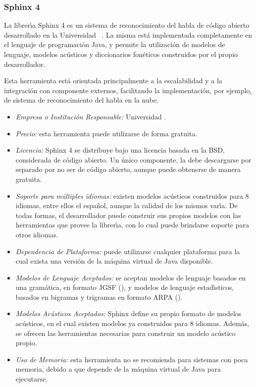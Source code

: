 \subsubsection{Sphinx 4}
\label{sec:sphinx}

La librer{\'\i}a Sphinx 4 es un sistema de reconocimiento del habla de c\'odigo abierto desarrollado en
la Universidad \mbox{ \cite{Sphinx4}}. La misma est\'a implementada
completamente en el lenguaje de programaci\'on Java, y permite la utilizaci\'on de modelos de lenguaje,
modelos ac\'usticos y diccionarios fon\'eticos construidos por el propio desarrollador.

Esta herramienta est\'a orientada principalmente a la escalabilidad y a la integraci\'on con
componente externos, facilitando la implementaci\'on, por ejemplo, de sistema de reconocimiento del
habla en la nube.

\begin{itemize}
	\item \emph{Empresa o Instituci\'on Responsable:} Universidad .
	\item \emph{Precio:} esta herramienta puede utilizarse de forma gratuita.
	\item \emph{Licencia:} Sphinx 4 se distribuye bajo una licencia basada en la BSD, considerada
	de c\'odigo abierto. Un \'unico componente, la  debe descargarse por
	separado por no ser de c\'odigo abierto, aunque puede obtenerse de manera gratuita.
	\item \emph{Soporte para m\'ultiples idiomas:} existen modelos ac\'usticos construidos para
	8 idiomas, entre ellos el espa\~nol, aunque la calidad de los mismos var{\'\i}a.
	De todas formas, el desarrollador puede construir sus propios modelos con las herramientas
	que provee la librer{\'\i}a, con lo cual puede brindarse soporte para otros idiomas.
	\item \emph{Dependencia de Plataforma:} puede utilizarse cualquier plataforma para la cual
	exista una versi\'on de la m\'aquina virtual de Java disponible.
	\item \emph{Modelos de Lenguaje Aceptados:} se aceptan modelos de lenguaje basados en una
        gram\'atica, en formato JGSF (), y modelos de 
        lenguaje estad{\'\i}sticos, basados en bigramas y trigramas en formato ARPA ().
	\item \emph{Modelos Ac\'usticos Aceptados:} Sphinx define su propio formato de modelos ac\'usticos,
	en el cual existen modelos ya construidos para 8 idiomas. Adem\'as, se ofrecen las herramientas
	necesarias para construir un modelo ac\'ustico propio.
	\item \emph{Uso de Memoria:} esta herramienta no se recomienda para sistemas con poca memoria,
	debido a que depende de la m\'aquina virtual de Java para ejecutarse.
\end{itemize}
